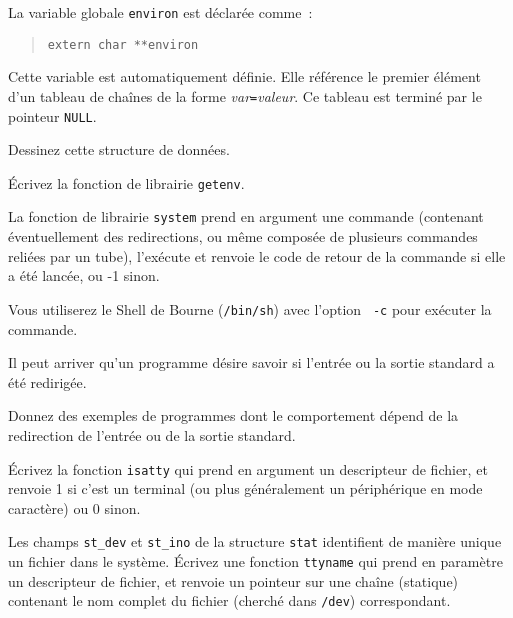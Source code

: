 %


% 


\question

La variable globale {\tt environ} est déclarée comme~:

\begin {quote}
    \verb|extern char **environ|
\end {quote}

Cette variable est automatiquement définie. Elle référence le premier
élément d'un tableau de chaînes de la forme {\em var{\tt=}valeur}. Ce
tableau est terminé par le pointeur {\tt NULL}.

Dessinez cette structure de données.

Écrivez la fonction de librairie {\tt getenv}.


\question

La fonction de librairie {\tt system} prend en argument une commande
(contenant éven\-tuel\-lement des redirections, ou même composée de
plusieurs commandes reliées par un tube), l'exécute et renvoie
le code de retour de la commande si elle a été lancée, ou -1
sinon.

Vous utiliserez le Shell de Bourne ({\tt /bin/sh}) avec l'option {\tt
-c} pour exécuter la commande.


\question

Il peut arriver qu'un programme désire savoir si l'entrée ou la
sortie standard a été redirigée.

Donnez des exemples de programmes dont le comportement dépend de la
redirection de l'entrée ou de la sortie standard.

Écrivez la fonction {\tt isatty} qui prend en argument un descripteur
de fichier, et renvoie 1 si c'est un terminal (ou plus généralement un
périphérique en mode caractère) ou 0 sinon.


\question

Les champs {\tt st\_dev} et {\tt st\_ino} de la structure {\tt stat}
identifient de manière unique un fichier dans le système. Écrivez une
fonction {\tt ttyname} qui prend en paramètre un descripteur de fichier,
et renvoie un pointeur sur une chaîne (statique) contenant le nom
complet du fichier (cherché dans {\tt /dev}) correspondant.


